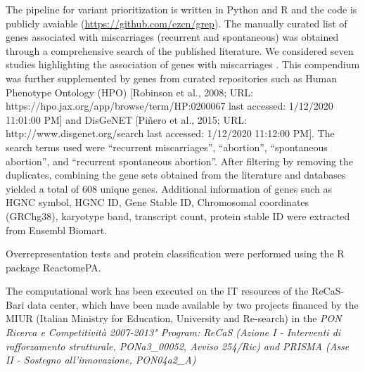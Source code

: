 The \gp pipeline for variant prioritization is written in Python and R and the code is publicly avaiable (\url{https://github.com/ezcn/grep}). The manually curated list of genes associated with miscarriages (recurrent and spontaneous) was obtained through a comprehensive search of the published literature. We considered seven studies highlighting the association of genes with miscarriages \cite{colley2019potential, fu2018whole, laisk2020genetic, pereza2017systematic, qiao2016whole, quintero2017novel, rull2012genetics}. This compendium was further supplemented by genes from curated repositories such as Human Phenotype Ontology (HPO) [Robinson et al., 2008; URL: https://hpo.jax.org/app/browse/term/HP:0200067 last accessed: 1/12/2020 11:01:00 PM] and DisGeNET [Piñero et al., 2015; URL: http://www.disgenet.org/search last accessed: 1/12/2020 11:12:00 PM]. The search terms used were “recurrent miscarriages”, “abortion”, “spontaneous abortion”, and “recurrent spontaneous abortion”. After filtering by removing the duplicates, combining the gene sets obtained from the literature and databases yielded a total of 608 unique genes. Additional information of genes such as HGNC symbol, HGNC ID, Gene Stable ID, Chromosomal coordinates (GRChg38), karyotype band, transcript count, protein stable ID were extracted from Ensembl Biomart\cite{kinsella2011ensembl}. %

Overrepresentation tests and protein classification were performed using the R package ReactomePA\cite{yu2016reactomepa}.  

The computational work has been executed on the IT resources of the ReCaS-Bari data center, which have been made available by two projects financed by the MIUR (Italian Ministry for Education, University and Re-search) in the \textit{PON Ricerca e Competitività 2007-2013" Program: ReCaS (Azione I - Interventi di rafforzamento strutturale, PONa3\_00052, Avviso 254/Ric) and PRISMA (Asse II - Sostegno all'innovazione, PON04a2\_A)}




